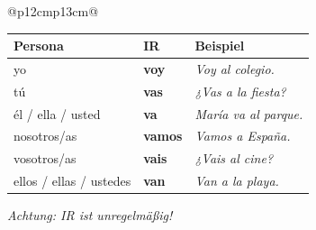\documentclass[11pt, a4paper, landscape]{article}
\begin{document}

\begin{center}
\end{center}

\vspace{0.8cm}

\begin{center}
\begin{tabular}{@{}p{12cm}p{13cm}@{}}

\begin{tcolorbox}[
    colback=spanisch!10,
    colframe=spanisch,
    title={\color{white}\Large\bfseries Konjugation (Presente)},
    fonttitle=\bfseries,
    width=11.5cm,
    height=9cm,
    valign=top
]

\begin{center}
\Large
\renewcommand{\arraystretch}{1.8}
\begin{tabular}{|l|l|l|}
\hline
\rowcolor{spanisch!20}
\textbf{Persona} & \textbf{IR} & \textbf{Beispiel} \\
\hline
yo & \textbf{\textcolor{spanisch}{voy}} & \textit{Voy al colegio.} \\
\hline
tú & \textbf{\textcolor{spanisch}{vas}} & \textit{¿Vas a la fiesta?} \\
\hline
él / ella / usted & \textbf{\textcolor{spanisch}{va}} & \textit{María va al parque.} \\
\hline
nosotros/as & \textbf{\textcolor{spanisch}{vamos}} & \textit{Vamos a España.} \\
\hline
vosotros/as & \textbf{\textcolor{spanisch}{vais}} & \textit{¿Vais al cine?} \\
\hline
ellos / ellas / ustedes & \textbf{\textcolor{spanisch}{van}} & \textit{Van a la playa.} \\
\hline
\end{tabular}
\end{center}

\vspace{0.3cm}
\footnotesize\textit{Achtung: IR ist unregelmäßig!}

\end{tcolorbox}


\end{tabular}
\end{center}
\end{document}
